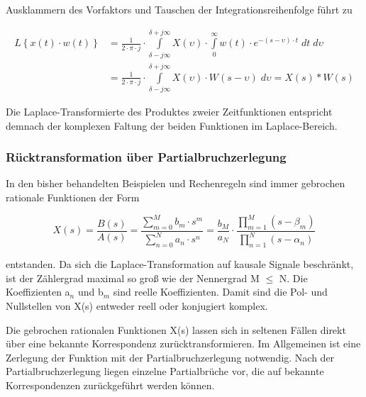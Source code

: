 \noindent Ausklammern des Vorfaktors und Tauschen der Integrationsreihenfolge führt zu

\begin{equation}\label{eq:fourhundredten}
\begin{split}
L\left\{x\left(t\right)\cdot w\left(t\right)\right\} & = {\frac{1}{2\cdot \pi \cdot j} \cdot \int\limits _{\delta -j\infty }^{\delta +j\infty }X\left(\upsilon \right) \cdot \int\limits _{0}^{\infty }w\left(t\right)\cdot e^{-(s-\upsilon )\cdot t} \;  dt\; d\upsilon } \\ 
& = {\frac{1}{2\cdot \pi \cdot j} \cdot \int\limits _{\delta -j\infty }^{\delta +j\infty }X\left(\upsilon \right) \cdot W\left(s-\upsilon \right)\; d\upsilon =X\left(s\right)*W\left(s\right)}
\end{split}
\end{equation}

\noindent Die Laplace-Transformierte des Produktes zweier Zeitfunktionen entspricht demnach der komplexen Faltung der beiden Funktionen im Laplace-Bereich.


\subsubsection{Rücktransformation über Partialbruchzerlegung}

\noindent In den bisher behandelten Beispielen und Rechenregeln sind immer gebrochen rationale Funktionen der Form 

\begin{equation}\label{eq:fourhundredeleven}
X\left(s\right)=\frac{B\left(s\right)}{A\left(s\right)} =\frac{\sum _{m=0}^{M}b_{m} \cdot s^{m}  }{\sum _{n=0}^{N}a_{n} \cdot s^{n}  } =\frac{b_{M} }{a_{N} } \cdot \frac{\prod _{m=1}^{M}\left(s-\beta _{m} \right) }{\prod _{n=1}^{N}\left(s-\alpha _{n} \right) } 
\end{equation}

\noindent entstanden. Da sich die Laplace-Transformation auf kausale Signale beschränkt, ist der Zählergrad maximal so gro{\ss} wie der Nennergrad M $\leq$ N. Die Koeffizienten a${}_{n}$ und b${}_{m}$ sind reelle Koeffizienten. Damit sind die Pol- und Nullstellen von X(s) entweder reell oder konjugiert komplex.

\noindent Die gebrochen rationalen Funktionen X(s) lassen sich in seltenen Fällen direkt über eine bekannte Korrespondenz zurücktransformieren. Im Allgemeinen ist eine Zerlegung der Funktion mit der Partialbruchzerlegung notwendig. Nach der Partialbruchzerlegung liegen einzelne Partialbrüche vor, die auf bekannte Korrespondenzen zurückgeführt werden können.\bigskip

